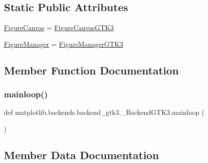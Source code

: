 \subsection*{Static Public Attributes}
\begin{DoxyCompactItemize}
\item 
\hyperlink{classmatplotlib_1_1backends_1_1backend__gtk3_1_1__BackendGTK3_ac0352ac34dfa919482cfab73ea3168d5}{Figure\+Canvas} = \hyperlink{classmatplotlib_1_1backends_1_1backend__gtk3_1_1FigureCanvasGTK3}{Figure\+Canvas\+G\+T\+K3}
\item 
\hyperlink{classmatplotlib_1_1backends_1_1backend__gtk3_1_1__BackendGTK3_a8b4c19bea195e179b261c6dc35193975}{Figure\+Manager} = \hyperlink{classmatplotlib_1_1backends_1_1backend__gtk3_1_1FigureManagerGTK3}{Figure\+Manager\+G\+T\+K3}
\end{DoxyCompactItemize}


\subsection{Member Function Documentation}
\mbox{\label{classmatplotlib_1_1backends_1_1backend__gtk3_1_1__BackendGTK3_aa3d41b20c9f35f250a97044f7378272b}} 
\subsubsection{\texorpdfstring{mainloop()}{mainloop()}}
{\footnotesize\ttfamily def matplotlib.\+backends.\+backend\+\_\+gtk3.\+\_\+\+Backend\+G\+T\+K3.\+mainloop (\begin{DoxyParamCaption}{ }\end{DoxyParamCaption})\hspace{0.3cm}{\ttfamily [static]}}



\subsection{Member Data Documentation}
\mbox{\label{classmatplotlib_1_1backends_1_1backend__gtk3_1_1__BackendGTK3_ac0352ac34dfa919482cfab73ea3168d5}} 
